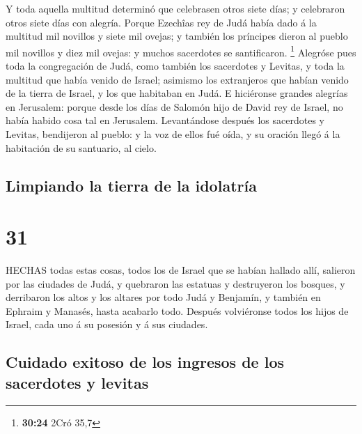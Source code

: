  Y toda aquella multitud determinó que celebrasen otros
siete días; y celebraron otros siete días con alegría. 
Porque Ezechîas rey de Judá había dado á la multitud mil novillos y
siete mil ovejas; y también los príncipes dieron al pueblo mil novillos
y diez mil ovejas: y muchos sacerdotes se santificaron. \footnote{\textbf{30:24}
  2Cró 35,7}  Alegróse pues toda la congregación de Judá,
como también los sacerdotes y Levitas, y toda la multitud que había
venido de Israel; asimismo los extranjeros que habían venido de la
tierra de Israel, y los que habitaban en Judá.  E
hiciéronse grandes alegrías en Jerusalem: porque desde los días de
Salomón hijo de David rey de Israel, no había habido cosa tal en
Jerusalem.  Levantándose después los sacerdotes y Levitas,
bendijeron al pueblo: y la voz de ellos fué oída, y su oración llegó á
la habitación de su santuario, al cielo.

\hypertarget{limpiando-la-tierra-de-la-idolatruxeda}{%
\subsection{Limpiando la tierra de la
idolatría}\label{limpiando-la-tierra-de-la-idolatruxeda}}

\hypertarget{section-30}{%
\section{31}\label{section-30}}

 HECHAS todas estas cosas, todos los de Israel que se habían
hallado allí, salieron por las ciudades de Judá, y quebraron las
estatuas y destruyeron los bosques, y derribaron los altos y los altares
por todo Judá y Benjamín, y también en Ephraim y Manasés, hasta acabarlo
todo. Después volviéronse todos los hijos de Israel, cada uno á su
posesión y á sus ciudades.

\hypertarget{cuidado-exitoso-de-los-ingresos-de-los-sacerdotes-y-levitas}{%
\subsection{Cuidado exitoso de los ingresos de los sacerdotes y
levitas}\label{cuidado-exitoso-de-los-ingresos-de-los-sacerdotes-y-levitas}}

